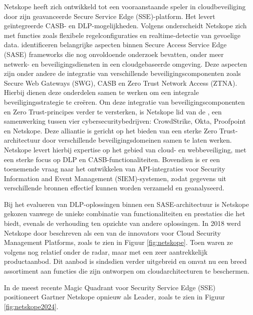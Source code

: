 Netskope heeft zich ontwikkeld tot een vooraanstaande speler in cloudbeveiliging door zijn geavanceerde Secure Service Edge (SSE)-platform. 
Het levert geïntegreerde CASB- en DLP-mogelijk\-heden. 
Volgens \textcite{Riley2018} onderscheidt Netskope zich met functies zoals flexibele regelconfiguraties en realtime-detectie van gevoelige data. 
\textcite{VanDerWalt2022} identificeren belangrijke aspecten binnen Secure Access Service Edge (SASE) frameworks die nog onvoldoende onderzoek bevatten,
onder meer netwerk- en beveiligingsdiensten in een cloudgebaseerde omgeving. 
Deze aspecten zijn onder andere de integratie van verschillende beveiligingscomponenten zoals Secure Web Gateways (SWG), CASB en Zero Trust Network Access (ZTNA). 
Hierbij dienen deze onderdelen samen te werken om een integrale beveiligingsstrategie te creëren. 
Om deze integratie van beveiligingscomponenten en Zero Trust-principes verder te versterken, 
is Netskope lid van de \textcite{SpectraAlliance2025}, een samenwerking tussen vier cybersecuritybedrijven: CrowdStrike, Okta, Proofpoint en Netskope.
Deze alliantie is gericht op het bieden van een sterke Zero Trust-architectuur door verschillende beveiligingsdomeinen samen te laten werken. 
Netskope levert hierbij expertise op het gebied van cloud- en webbeveiliging, met een sterke focus op DLP\- en CASB\--functionaliteiten.
Bovendien is er een toenemende vraag naar het ontwikkelen van API\--integraties voor Security Information and Event Management (SIEM)\--systemen, 
zodat gegevens uit verschillende bronnen effectief kunnen worden verzameld en geanalyseerd.

Bij het evalueren van DLP-oplossingen binnen een SASE-architectuur is Netskope gekozen vanwege de unieke combinatie van functionaliteiten en prestaties die het biedt, 
evenals de verhouding ten opzichte van andere oplossingen. In 2018 werd Netskope door \textcite{Hille2018} beschreven als een van de innovators voor Cloud Security Management Platforms, 
zoals te zien in Figuur \ref{fig:netskope}.  
Toen waren ze volgens \textcite{Hille2018} nog relatief onder de radar, maar met een zeer aantrekkelijk productaanbod. 
Dit aanbod is sindsdien verder uitgebreid en omvat nu een breed assortiment aan functies die zijn ontworpen om cloudarchitecturen te beschermen. 

In de meest recente Magic Quadrant voor Security Service Edge (SSE) positioneert Gartner Netskope opnieuw als Leader, zoals te zien in Figuur \ref{fig:netskope2024}.

